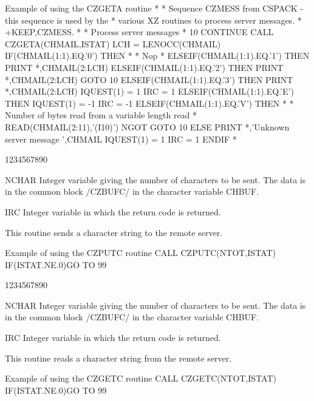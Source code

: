 \begin{XMPt}{Example of using the CZGETA routine}
*
*     Sequence CZMESS from CSPACK - this sequence is used by the
*     various XZ routines to process server messages.
*
+KEEP,CZMESS.
*
*     Process server messages
*
10    CONTINUE
      CALL CZGETA(CHMAIL,ISTAT)
      LCH = LENOCC(CHMAIL)
      IF(CHMAIL(1:1).EQ.'0') THEN
*
*        Nop
*
      ELSEIF(CHMAIL(1:1).EQ.'1') THEN
         PRINT *,CHMAIL(2:LCH)
      ELSEIF(CHMAIL(1:1).EQ.'2') THEN
         PRINT *,CHMAIL(2:LCH)
         GOTO 10
      ELSEIF(CHMAIL(1:1).EQ.'3') THEN
         PRINT *,CHMAIL(2:LCH)
         IQUEST(1) = 1
         IRC       = 1
      ELSEIF(CHMAIL(1:1).EQ.'E') THEN
         IQUEST(1) = -1
         IRC       = -1
      ELSEIF(CHMAIL(1:1).EQ.'V') THEN
*
*        Number of bytes read from a variable length read
*
         READ(CHMAIL(2:11),'(I10)') NGOT
         GOTO 10
      ELSE
         PRINT *,'Unknown server message ',CHMAIL
         IQUEST(1) = 1
         IRC       = 1
      ENDIF
*
\end{XMPt}
\begin{DLtt}{1234567890}
\item[NCHAR]Integer variable giving the number of characters to be sent. The
data is in the common block /CZBUFC/ in the character variable
CHBUF.
\item[IRC]Integer variable in which the return code is returned.
\end{DLtt}
\par
This routine sends a character string to the remote server.
\begin{XMPt}{Example of using the CZPUTC routine}
      CALL CZPUTC(NTOT,ISTAT)
      IF(ISTAT.NE.0)GO TO 99
\end{XMPt}
\begin{DLtt}{1234567890}
\item[NCHAR]Integer variable giving the number of characters to be sent. The
data is in the common block /CZBUFC/ in the character variable
CHBUF.
\item[IRC]Integer variable in which the return code is returned.
\end{DLtt}
\par
This routine reads a character string from the remote server.
\begin{XMPt}{Example of using the CZGETC routine}
      CALL CZGETC(NTOT,ISTAT)
      IF(ISTAT.NE.0)GO TO 99
\end{XMPt}
